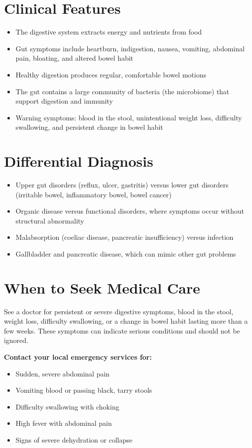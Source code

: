 \section*{Clinical Features}
\begin{itemize}
    \item The digestive system extracts energy and nutrients from food
    \item Gut symptoms include heartburn, indigestion, nausea, vomiting, abdominal pain, bloating, and altered bowel habit
    \item Healthy digestion produces regular, comfortable bowel motions
    \item The gut contains a large community of bacteria (the microbiome) that support digestion and immunity
    \item Warning symptoms: blood in the stool, unintentional weight loss, difficulty swallowing, and persistent change in bowel habit
\end{itemize}

\section*{Differential Diagnosis}
\begin{itemize}
    \item Upper gut disorders (reflux, ulcer, gastritis) versus lower gut disorders (irritable bowel, inflammatory bowel, bowel cancer)
    \item Organic disease versus functional disorders, where symptoms occur without structural abnormality
    \item Malabsorption (coeliac disease, pancreatic insufficiency) versus infection
    \item Gallbladder and pancreatic disease, which can mimic other gut problems
\end{itemize}

\section*{When to Seek Medical Care}
See a doctor for persistent or severe digestive symptoms, blood in the stool, weight loss, difficulty swallowing, or a change in bowel habit lasting more than a few weeks. These symptoms can indicate serious conditions and should not be ignored.

\textbf{Contact your local emergency services for:}
\begin{itemize}
    \item Sudden, severe abdominal pain
    \item Vomiting blood or passing black, tarry stools
    \item Difficulty swallowing with choking
    \item High fever with abdominal pain
    \item Signs of severe dehydration or collapse
\end{itemize}

